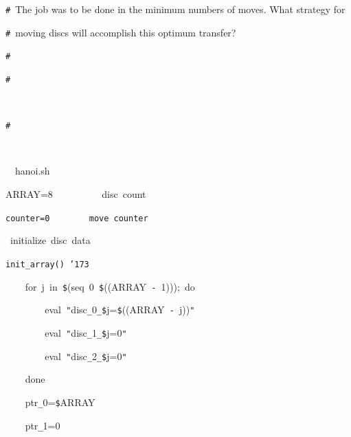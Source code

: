 \documentclass{article}
\begin{document}
\noindent
\mbox{}{\tt\#}\  {}\hspace{\leftmargini}The job was to be done in the minimum numbers of moves. What strategy for  \rm\mc 

\noindent
\mbox{}{\tt\#}\  {}\hspace{\leftmargini}moving discs will accomplish this optimum transfer?  \rm\mc 

\noindent
\mbox{}{\tt\#}\  {}  \rm\mc 

\noindent
\mbox{}{\tt\#}
\tt\mc 

\noindent
\mbox{}\rm\mc {\tt\#}\  {}%

\noindent
\mbox{}{\tt\#}
\tt\mc 

\noindent
\mbox{}\rm\mc {\tt\#}\  \hrulefill  \rm\mc 

\noindent
\mbox{}\tt\mc \hfill

\noindent
\mbox{}\rm\mc {\tt\#}\  \hrulefill\ hanoi.sh \ \hrulefill \rm\mc 

\noindent
\mbox{}\tt\mc \hfill

\noindent
\mbox{}\hfill

\noindent
\mbox{}ARRAY=8{\tt\mc \ \ \ \ \ \ \ \ \ }\rm\mc {\tt\#}\ disc\ count

\noindent
\mbox{}\tt\mc counter=0{\tt\mc \ \ \ \ \ \ \ }\rm\mc {\tt\#}\ move\ counter

\noindent
\mbox{}\tt\mc \hfill

\noindent
\mbox{}\rm\mc {\tt\#}\ initialize\ disc\ data

\noindent
\mbox{}\tt\mc init{\tt\_}array(){\tt\mc \ }{\tt\char'173}

\noindent
\mbox{}{\tt\mc \ \ \ \ }for{\tt\mc \ }j{\tt\mc \ }in{\tt\mc \ }{\tt\$}(seq{\tt\mc \ }0{\tt\mc \ }{\tt\$}((ARRAY{\tt\mc \ }{\tt -}{\tt\mc \ }1)));{\tt\mc \ }do

\noindent
\mbox{}{\tt\mc \ \ \ \ \ \ \ \ }eval{\tt\mc \ }{\tt "}disc{\tt\_}0{\tt\_}{\tt\$}j={\tt\$}((ARRAY{\tt\mc \ }{\tt -}{\tt\mc \ }j)){\tt "}

\noindent
\mbox{}{\tt\mc \ \ \ \ \ \ \ \ }eval{\tt\mc \ }{\tt "}disc{\tt\_}1{\tt\_}{\tt\$}j=0{\tt "}

\noindent
\mbox{}{\tt\mc \ \ \ \ \ \ \ \ }eval{\tt\mc \ }{\tt "}disc{\tt\_}2{\tt\_}{\tt\$}j=0{\tt "}

\noindent
\mbox{}{\tt\mc \ \ \ \ }done

\noindent
\mbox{}{\tt\mc \ \ \ \ }ptr{\tt\_}0={\tt\$}ARRAY

\noindent
\mbox{}{\tt\mc \ \ \ \ }ptr{\tt\_}1=0
\end{document}
